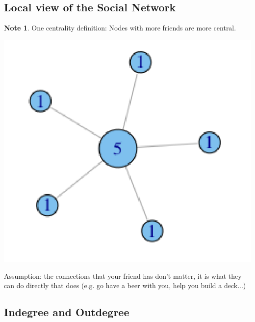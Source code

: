 \documentclass[11pt]{article}
\theoremstyle{definition}
\newtheorem{note}{Note}
\begin{document}
\subsection{Local view of the Social Network}
\begin{note}
    One centrality definition:
Nodes with more friends are more central.
\end{note}
\includegraphics[width=\textwidth/2]{13.png}

Assumption: the connections that your friend has don't matter, it is what they
can do directly that does (e.g. go have a beer with you, help you build a
deck...)

\subsection{Indegree and Outdegree}
\end{document}
